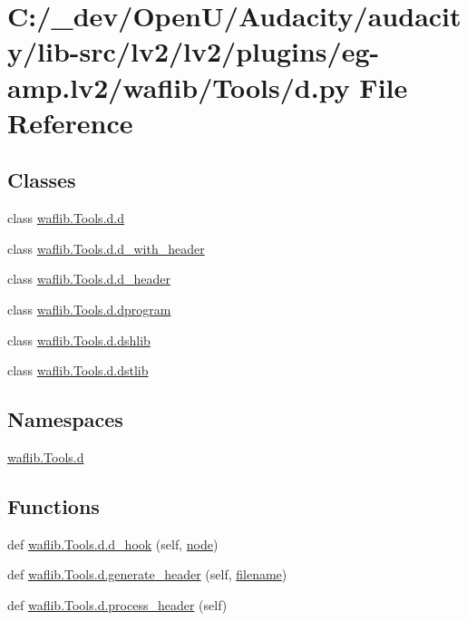 \hypertarget{lv2_2plugins_2eg-amp_8lv2_2waflib_2_tools_2d_8py}{}\section{C\+:/\+\_\+dev/\+Open\+U/\+Audacity/audacity/lib-\/src/lv2/lv2/plugins/eg-\/amp.lv2/waflib/\+Tools/d.py File Reference}
\label{lv2_2plugins_2eg-amp_8lv2_2waflib_2_tools_2d_8py}
\subsection*{Classes}
\begin{DoxyCompactItemize}
\item 
class \hyperlink{classwaflib_1_1_tools_1_1d_1_1d}{waflib.\+Tools.\+d.\+d}
\item 
class \hyperlink{classwaflib_1_1_tools_1_1d_1_1d__with__header}{waflib.\+Tools.\+d.\+d\+\_\+with\+\_\+header}
\item 
class \hyperlink{classwaflib_1_1_tools_1_1d_1_1d__header}{waflib.\+Tools.\+d.\+d\+\_\+header}
\item 
class \hyperlink{classwaflib_1_1_tools_1_1d_1_1dprogram}{waflib.\+Tools.\+d.\+dprogram}
\item 
class \hyperlink{classwaflib_1_1_tools_1_1d_1_1dshlib}{waflib.\+Tools.\+d.\+dshlib}
\item 
class \hyperlink{classwaflib_1_1_tools_1_1d_1_1dstlib}{waflib.\+Tools.\+d.\+dstlib}
\end{DoxyCompactItemize}
\subsection*{Namespaces}
\begin{DoxyCompactItemize}
\item 
 \hyperlink{namespacewaflib_1_1_tools_1_1d}{waflib.\+Tools.\+d}
\end{DoxyCompactItemize}
\subsection*{Functions}
\begin{DoxyCompactItemize}
\item 
def \hyperlink{namespacewaflib_1_1_tools_1_1d_a0b6f5907fb19962703822b05f5d2c7f6}{waflib.\+Tools.\+d.\+d\+\_\+hook} (self, \hyperlink{structnode}{node})
\item 
def \hyperlink{namespacewaflib_1_1_tools_1_1d_abeab4cb06670217a6a35b8a77933e947}{waflib.\+Tools.\+d.\+generate\+\_\+header} (self, \hyperlink{test__portburn_8cpp_a7efa5e9c7494c7d4586359300221aa5d}{filename})
\item 
def \hyperlink{namespacewaflib_1_1_tools_1_1d_ae7724c426c7d6b03c2f1e81bf03f40a9}{waflib.\+Tools.\+d.\+process\+\_\+header} (self)
\end{DoxyCompactItemize}
